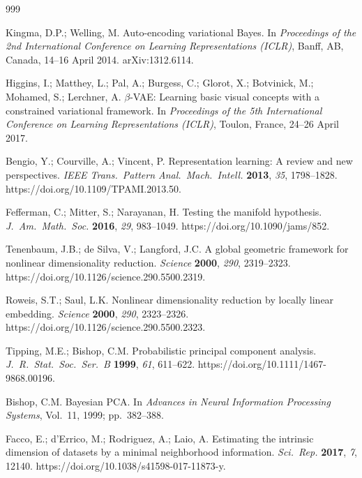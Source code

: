 \documentclass[11pt,a4paper]{jsarticle}
\begin{document}
\begin{thebibliography}{999}

Kingma, D.P.; Welling, M.
Auto-encoding variational Bayes.
In \textit{Proceedings of the 2nd International Conference on Learning
Representations (ICLR)}, Banff, AB, Canada, 14--16 April 2014.
arXiv:1312.6114.

Higgins, I.; Matthey, L.; Pal, A.; Burgess, C.; Glorot, X.; Botvinick, M.;
Mohamed, S.; Lerchner, A.
$\beta$-VAE: Learning basic visual concepts with a constrained variational
framework.
In \textit{Proceedings of the 5th International Conference on Learning
Representations (ICLR)}, Toulon, France, 24--26 April 2017.

Bengio, Y.; Courville, A.; Vincent, P.
Representation learning: A review and new perspectives.
\textit{IEEE Trans.\ Pattern Anal.\ Mach.\ Intell.} \textbf{2013},
\textit{35}, 1798--1828. https://doi.org/10.1109/TPAMI.2013.50.

Fefferman, C.; Mitter, S.; Narayanan, H.
Testing the manifold hypothesis.
\textit{J.\ Am.\ Math.\ Soc.} \textbf{2016}, \textit{29}, 983--1049.
https://doi.org/10.1090/jams/852.

Tenenbaum, J.B.; de Silva, V.; Langford, J.C.
A global geometric framework for nonlinear dimensionality reduction.
\textit{Science} \textbf{2000}, \textit{290}, 2319--2323.
https://doi.org/10.1126/science.290.5500.2319.

Roweis, S.T.; Saul, L.K.
Nonlinear dimensionality reduction by locally linear embedding.
\textit{Science} \textbf{2000}, \textit{290}, 2323--2326.
https://doi.org/10.1126/science.290.5500.2323.

Tipping, M.E.; Bishop, C.M.
Probabilistic principal component analysis.
\textit{J.\ R.\ Stat.\ Soc.\ Ser.\ B} \textbf{1999}, \textit{61}, 611--622.
https://doi.org/10.1111/1467-9868.00196.

Bishop, C.M.
Bayesian PCA.
In \textit{Advances in Neural Information Processing Systems}, Vol.~11,
1999; pp.~382--388.

Facco, E.; d'Errico, M.; Rodriguez, A.; Laio, A.
Estimating the intrinsic dimension of datasets by a minimal neighborhood
information.
\textit{Sci.\ Rep.} \textbf{2017}, \textit{7}, 12140.
https://doi.org/10.1038/s41598-017-11873-y.


\end{thebibliography}
\end{document}
